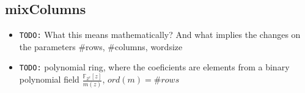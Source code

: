 \documentclass[10pt,a4paper,twoside]{llncs}
\newcommand{\Fpn}[2]{\ensuremath{\mathbb{F}_{#1^#2}}}
\newcommand{\Fpnm}[2]{\ensuremath{\frac{\Fpn{2}{#1}[#2]}{m(#2)}}}
\begin{document}
\subsection{mixColumns}\label{sec:mixColumns}
\begin{itemize}
 \item \texttt{TODO:} What this means mathematically? And what implies the changes on the parameters \#rows, \#columns, wordsize
 \item \texttt{TODO:} polynomial ring, where the coeficients are elements from a binary polynomial field \Fpnm{x}{z}, $ord(m)=\#rows$
\end{itemize}

\end{document}
